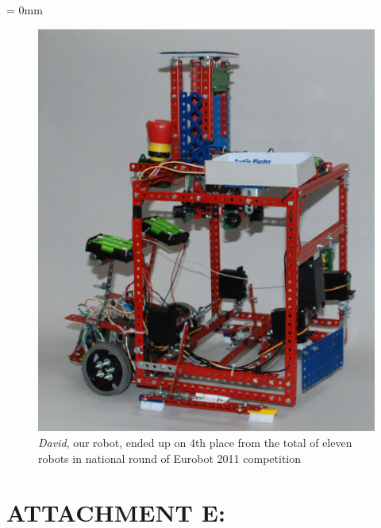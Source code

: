 \documentclass[12pt, a4paper, oneside]{article}
\newcommand{\It}{\textit}  %
\begin{document}
\pagestyle{plain}
\textheight=592pt
\textwidth=392pt
\newpage
\voffset = 0mm
\begin{figure}[H]
\begin{center}
\includegraphics[width=\textwidth]{img/use_david_robot.jpg}
\caption{\It{David}, our robot, ended up on 4th place from the total of eleven robots in national round of Eurobot 2011 competition}
\label{david}
\end{center}
\end{figure}


\newpage
\section*{ATTACHMENT E:}
~
\listoffigures   %
\end{document}
